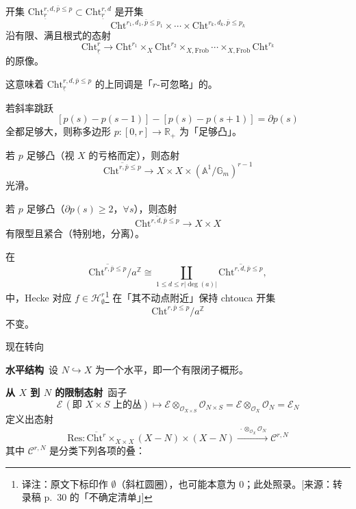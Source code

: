 \begin{lemma*}
开集 $\mathrm{Cht}^{r,d,\bar{p}\le p}_{\underline{r}}\subset\mathrm{Cht}^{r,d}_{\underline{r}}$ 是开集
\[
\mathrm{Cht}^{r_{1},d_{1},\bar{p}\le p_{1}}\times\cdots\times\mathrm{Cht}^{r_{k},d_{k},\bar{p}\le p_{k}}
\]
沿有限、满且根式的态射
\[
\mathrm{Cht}^{r}_{\underline{r}}\to\mathrm{Cht}^{r_{1}}\times_{X}\mathrm{Cht}^{r_{2}}\times_{X,\mathrm{Frob}}\cdots\times_{X,\mathrm{Frob}}\mathrm{Cht}^{r_{k}}
\]
的原像。
\end{lemma*}

\begin{remark*}
这意味着 $\mathrm{Cht}^{r,d,\bar{p}\le p}_{\underline{r}}$ 的上同调是「$r$-可忽略」的。
\end{remark*}

若斜率跳跃
\[
[p(s)-p(s-1)]-[p(s)-p(s+1)]=\partial p(s)
\]
全都足够大，则称多边形 $p:[0,r]\to\mathbb{R}_{+}$ 为「足够凸」。

\begin{proposition*}
若 $p$ 足够凸（视 $X$ 的亏格而定），则态射
\[
\overline{\mathrm{Cht}^{r,\bar{p}\le p}}\to X\times X\times(\mathbb{A}^{1}/\mathbb{G}_{m})^{r-1}
\]
光滑。
\end{proposition*}

\begin{theorem*}
若 $p$ 足够凸（$\partial p(s)\ge 2$，$\forall s$），则态射
\[
\overline{\mathrm{Cht}^{r,d,\bar{p}\le p}}\to X\times X
\]
有限型且紧合（特别地，分离）。
\end{theorem*}

\begin{theorem*}
在
\[
\overline{\mathrm{Cht}^{r,\bar{p}\le p}}/a^{\mathbb{Z}}\cong\coprod_{1\le d\le r|\deg(a)|}\overline{\mathrm{Cht}^{r,d,\bar{p}\le p}},
\]
中，Hecke 对应 $f\in\mathcal{H}^{r}_{\emptyset}$\footnote{译注：原文下标印作 $\emptyset$（斜杠圆圈），也可能本意为 $0$；此处照录。[来源：转录稿 p.~30 的「不确定清单」]} 在「其不动点附近」保持 chtouca 开集
\[
\mathrm{Cht}^{r,\bar{p}\le p}/a^{\mathbb{Z}}
\]
不变。
\end{theorem*}

现在转向
\par\medskip\noindent\textbf{水平结构}\ 
设 $N\hookrightarrow X$ 为一个水平，即一个有限闭子概形。

\par\medskip\noindent\textbf{从 $X$ 到 $N$ 的限制态射}\ 
函子
\[
\mathcal{E}\,(\text{即 }X\times S\text{ 上的丛})\mapsto\mathcal{E}\otimes_{\mathcal{O}_{X\times S}}\mathcal{O}_{N\times S}=\mathcal{E}\otimes_{\mathcal{O}_{X}}\mathcal{O}_{N}=\mathcal{E}_{N}
\]
定义出态射
\[
\mathrm{Res}:\overline{\mathrm{Cht}^{r}}\times_{X\times X}(X-N)\times(X-N)\xrightarrow{\ \cdot\otimes_{\mathcal{O}_{X}}\mathcal{O}_{N}\ }\mathcal{C}^{r,N}
\]
其中 $\mathcal{C}^{r,N}$ 是分类下列各项的叠：

